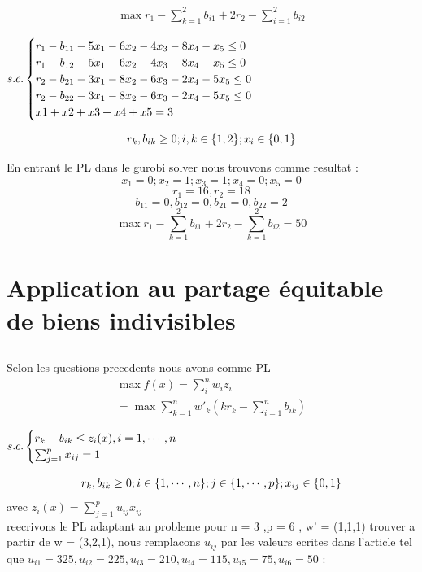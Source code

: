 \documentclass[16pt, a4paper]{article}
\begin{document}
\begin{flushleft}
\begin{justify}
\begin{align*}
\max r_1- \sum_{k=1}^2 b_{i1} + 2r_2- \sum_{i=1}^2 b_{i2}
\end{align*}
\begin{center}
    \begin{math}
        s.c.\begin{cases}
        r_1 - b_{11} - 5x_1 - 6x_2 - 4x_3 - 8x_4 - x_5    \leq 0  \\
        r_1 - b_{12} - 5x_1 - 6x_2 - 4x_3 - 8x_4 - x_5   \leq 0 \\
        r_2 - b_{21} - 3x_1 - 8x_2 - 6x_3 - 2x_4 - 5x_5 \leq 0 \\
        r_2 - b_{22}  - 3x_1 - 8x_2 - 6x_3 - 2x_4 - 5x_5  \leq 0 \\
        x1 + x2 + x3 +x4 + x5 = 3
        \end{cases}\\
    \end{math}
\end{center}
$$r_{k}, b_{ik} \geq 0 ; i,k\in \{1,2\} ; x_i \in \{0,1\}\\$$

En entrant le PL dans le gurobi solver nous trouvons comme resultat : 
$$ x_1 = 0 ; x_2 = 1 ; x_3 = 1 ; x_4 = 0 ; x_5 = 0$$
$$ r_1 = 16, r_2 = 18$$
$$ b_{11} = 0  , b_{12} =0 ,b_{21} =0 , b_{22} =2 $$
$$ \max  r_1- \sum_{k=1}^2 b_{i1} + 2r_2- \sum_{k=1}^2 b_{i2} = 50 $$ 


\pagebreak
\section{Application au partage équitable de biens indivisibles}
\subsection{}
Selon les questions precedents nous avons comme PL 
\begin{align*}
    \max f(x) =  \sum_{i}^n w_iz_i \\
    = \max \sum_{k=1}^n w'_k(kr_k- \sum_{i=1}^n b_{ik})
\end{align*}

\begin{center}
    \begin{math}
        s.c.\begin{cases}
            r_k - b_{ik} \leq z_i(x) , i = 1,\cdots,n\\
            \sum_{j = 1}^p x_{ij} = 1
       
        
        \end{cases}\\
    \end{math}
\end{center}
$$r_{k}, b_{ik} \geq 0 ; i\in \{1,\cdots, n\} ; j \in \{1,\cdots,p\} ; x_{ij} \in \{0,1\}\\$$
avec $z_i(x) = \sum_{j=1}^p u_{ij}x_{ij}$ \\
reecrivons le PL adaptant au probleme pour  n = 3 ,p = 6 , w' = (1,1,1) trouver a partir de w =  (3,2,1), nous remplacons $u_{ij}$ par les valeurs ecrites dans l'article tel que $ u_{i1} = 325, u_{i2} = 225, u_{i3} = 210 , u_{i4} =  115 , u_{i5} = 75 , u_{i6} =  50$ : 


\end{justify}
\end{flushleft}
\end{document}
